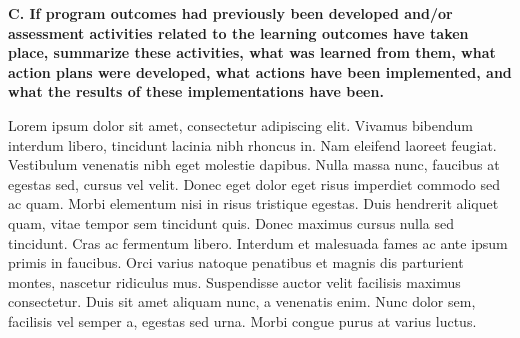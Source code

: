 \textbf{C. If program outcomes had previously been developed and/or assessment activities related to the learning outcomes have taken place, summarize these activities, what was learned from them, what action plans were developed, what actions have been implemented, and what the results of these implementations have been. }

Lorem ipsum dolor sit amet, consectetur adipiscing elit. Vivamus bibendum interdum libero, tincidunt lacinia nibh rhoncus in. Nam eleifend laoreet feugiat. Vestibulum venenatis nibh eget molestie dapibus. Nulla massa nunc, faucibus at egestas sed, cursus vel velit. Donec eget dolor eget risus imperdiet commodo sed ac quam. Morbi elementum nisi in risus tristique egestas. Duis hendrerit aliquet quam, vitae tempor sem tincidunt quis. Donec maximus cursus nulla sed tincidunt. Cras ac fermentum libero. Interdum et malesuada fames ac ante ipsum primis in faucibus. Orci varius natoque penatibus et magnis dis parturient montes, nascetur ridiculus mus. Suspendisse auctor velit facilisis maximus consectetur. Duis sit amet aliquam nunc, a venenatis enim. Nunc dolor sem, facilisis vel semper a, egestas sed urna. Morbi congue purus at varius luctus. 


